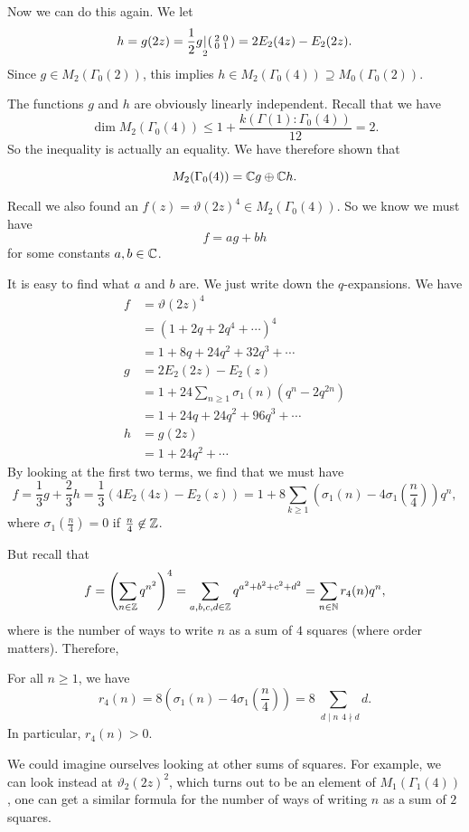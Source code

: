 \documentclass[a4paper]{article}
\begin{document}
Now we can do this again. We let
\[
  h = g(2z) = \frac{1}{2} g\underset{2}{|}
  \begin{psmallmatrix}
    2 & 0\\
    0 & 1
  \end{psmallmatrix} = 2 E_2(4z) - E_2(2z).
\]
Since $g \in M_2(\Gamma_0(2))$, this implies $h \in M_2(\Gamma_0(4))\supseteq M_0 (\Gamma_0(2))$.

The functions $g$ and $h$ are obviously linearly independent. Recall that we have
\[
  \dim M_2(\Gamma_0(4)) \leq 1 + \frac{k(\Gamma(1): \Gamma_0(4))}{12} = 2.
\]
So the inequality is actually an equality. We have therefore shown that
\begin{thm}
  \[
    M_2(\Gamma_0(4)) = \mathbb{C} g \oplus \mathbb{C} h.
  \]
\end{thm}

Recall we also found an $f(z) = \vartheta(2z)^{4} \in M_2(\Gamma_0(4))$. So we know we must have
\[
  f = ag + bh
\]
for some constants $a, b \in \mathbb{C}$.

It is easy to find what $a$ and $b$ are. We just write down the $q$-expansions. We have
\begin{align*}
  f &= \vartheta(2z)^4 \\
  &= (1 + 2q + 2q^4 + \cdots)^4\\
  &= 1 + 8q + 24 q^2 + 32 q^3 + \cdots\\
  g &= 2 E_2(2z) - E_2(z)\\
  &= 1 + 24 \sum_{n \geq 1 } \sigma_1(n) (q^n - 2 q^{2n})\\
  &= 1 + 24q + 24 q^2 + 96 q^3 + \cdots\\
  h &= g(2z)\\
  &= 1 + 24 q^2 + \cdots
\end{align*}
By looking at the first two terms, we find that we must have
\[
  f = \frac{1}{3}g + \frac{2}{3} h = \frac{1}{3} (4 E_2(4z) - E_2(z)) = 1 + 8 \sum_{k \geq 1} \left(\sigma_1(n) - 4 \sigma_1\left(\frac{n}{4}\right)\right) q^n,
\]
where $\sigma_1\left(\frac{n}{4}\right) = 0$ if $\frac{n}{4} \not \in \mathbb{Z}$.

But recall that
\[
  f = \left(\sum_{n \in \mathbb{Z}} q^{n^2}\right)^4 = \sum_{a, b, c, d \in \mathbb{Z}} q^{a^2 + b^2 + c^2 + d^2} = \sum_{n \in \mathbb{N}} r_4(n) q^n,
\]
where  is the number of ways to write $n$ as a sum of $4$ squares (where order matters). Therefore,
\begin{thm}
  For all $n \geq 1$, we have
  \[
    r_4(n) = 8\left(\sigma_1(n) - 4 \sigma_1\left(\frac{n}{4}\right)\right) = 8 \sum_{\substack{d \mid n}{4 \nmid d}} d.
  \]
  In particular, $r_4(n) > 0$.
\end{thm}
We could imagine ourselves looking at other sums of squares. For example, we can look instead at $\vartheta_2(2z)^2$, which turns out to be an element of $M_1(\Gamma_1(4))$, one can get a similar formula for the number of ways of writing $n$ as a sum of $2$ squares.
\end{document}
